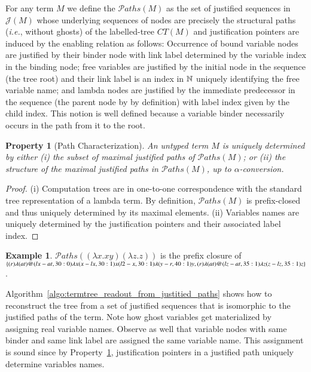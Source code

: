 \documentclass{elsarticle}
\makeatletter
\theoremstyle{plain}
\newtheorem{property}[theorem]{Property}
\theoremstyle{definition}
\newtheorem{example}{Example}[section]
\theoremstyle{remark}
\newcommand{\ctree}{CT} %
\newcommand\pathset{{\mathcal{P}aths}} %
\renewcommand\ie{{\it i.e.\@\xspace}}
\def\justseqset{\mathcal{J}}
\makeatother
\begin{document}
For any term $M$ we define the  $\pathset(M)$ as the set of justified sequences in $\justseqset(M)$ whose underlying sequences of nodes are precisely the structural paths (\ie, without ghosts) of the labelled-tree $\ctree(M)$ and justification pointers are induced by the enabling relation as follows: Occurrence of bound variable nodes are justified by their binder node with link label determined by the variable index in the binding node; free variables are justified by the initial node in the sequence (the tree root) and their link label is an index in $\mathbb{N}$ uniquely identifying the free variable name; and lambda nodes are justified by the immediate predecessor in the sequence (the parent node by by definition) with label index given by the child index. This notion is well defined because a variable binder necessarily occurs in the path from it to the root.
\begin{property}[Path Characterization]
\label{prop:tree_path_charact}
 An untyped term $M$ is uniquely determined by either
(i) the subset of maximal justified paths of $\pathset(M)$;
or (ii) the \emph{structure} of the maximal justified paths in $\pathset(M)$, up to $\alpha$-conversion.
\end{property}
\begin{proof}
(i) Computation trees are in one-to-one correspondence with the standard tree representation of a lambda term. By definition, $\pathset(M)$ is prefix-closed and thus uniquely determined by its maximal elements. (ii) Variables names are uniquely determined by the justification pointers and their associated label index.
\end{proof}

\begin{example}
  $\pathset((\lambda x.x y) (\lambda z.z))$ is the prefix closure of
  $\{
  \Pstr{ (r){\lambda} (at){@} (lx-at,30:0){\lambda x} (x-lx,30:1){x} (l2-x,30:1){\lambda} (y-r,40:1){y} },
  \Pstr{ (r){\lambda} (at){@} (lz-at,35:1){\lambda z} (z-lz,35:1){z}}
  \}$.
\end{example}

Algorithm~\ref{algo:termtree_readout_from_justitied_paths} shows how to reconstruct the tree from a set of justified sequences that is isomorphic to the justified paths of the term. Note how ghost variables get materialized by  assigning real variable names. Observe as well that variable nodes with same binder and same link label are assigned the same variable name. This assignment is sound since by Property~\ref{prop:tree_path_charact}, justification pointers in a justified path uniquely determine variables names.
\end{document}
